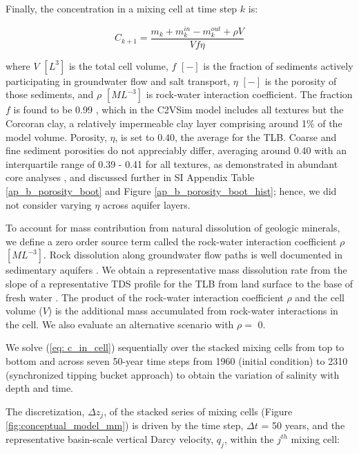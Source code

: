 Finally, the concentration in a mixing cell at time step $k$ is:

\begin{equation}
C_{k+1} = \frac{m_k + m_k^{in} - m_k^{out} + \rho V}{V f \eta}
\label{eq: c_in_cell}
\end{equation}


where $V$ $[L^3]$ is the total cell volume, $f$ $[-]$ is the fraction of sediments actively participating in groundwater flow and salt transport, $\eta$ $[-]$ is the porosity of those sediments, and $\rho$ $[ML^{-3}]$ is rock-water interaction coefficient. The fraction $f$ is found to be 0.99 \citep{Brush2013}, which in the C2VSim model includes all textures but the Corcoran clay, a relatively impermeable clay layer comprising around 1\% of the model volume. Porosity, $\eta$, is set to 0.40, the average for the TLB. Coarse and fine sediment porosities do not appreciably differ, averaging around 0.40 with an interquartile range of 0.39 - 0.41 for all textures, as demonstrated in abundant core analyses \citep{Johnson1968}, and discussed further in SI Appendix Table \ref{ap_b_porosity_boot} and Figure \ref{ap_b_porosity_boot_hist}; hence, we did not consider varying $\eta$ across aquifer layers. 

To account for mass contribution from natural dissolution of geologic minerals, we define a zero order source term called the rock-water interaction coefficient $\rho$ $[ML^{-3}]$. Rock dissolution along groundwater flow paths is well documented in sedimentary aquifers \citep{palmer1984geochemical, oetting1996regional, toth1999groundwater, mahlknecht2004groundwater, cloutier2008multivariate}. We obtain a representative mass dissolution rate from the slope of a representative TDS profile for the TLB from land surface to the base of fresh water \citep{Williamson1989, Kang2016}. The product of the rock-water interaction coefficient $\rho$ and the cell volume ($V$) is the additional mass accumulated from rock-water interactions in the cell. We also evaluate an alternative scenario with $\rho =$ 0. 

We solve (\ref{eq: c_in_cell}) sequentially over the stacked mixing cells from top to bottom and across seven 50-year time steps from 1960 (initial condition) to 2310 (synchronized tipping bucket approach) to obtain the variation of salinity with depth and time. 

The discretization, $\Delta z_j$, of the stacked series of mixing cells (Figure \ref{fig:conceptual_model_mm}) is driven by the time step, $\Delta t$ = 50 years, and the representative basin-scale vertical Darcy velocity, $q_j$, within the $j^{th}$ mixing cell:

